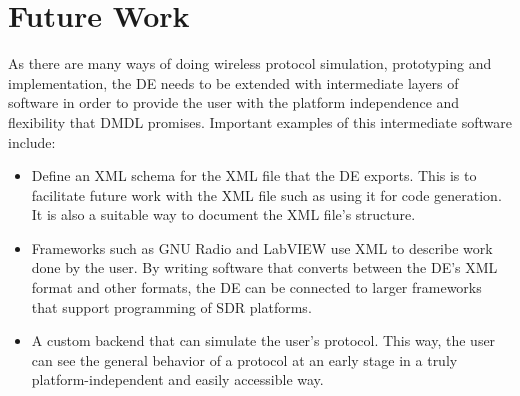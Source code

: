 \documentclass[journal,comsoc]{IEEEtran}
\begin{document}
\section{Future Work}
As there are many ways of doing wireless protocol simulation, prototyping and implementation, the
DE needs to be extended with intermediate layers of software in order to provide the user with
the platform independence and flexibility that DMDL promises. Important examples of this
intermediate software include:
\begin{itemize}
    \item Define an XML schema for the XML file that the DE exports. This is to facilitate
          future work with the XML file such as using it for code generation. It is also a
          suitable way to document the XML file's structure.
    \item Frameworks such as GNU Radio and LabVIEW use XML to describe work done by the user.
          By writing software that converts between the DE's XML format and other formats, the
          DE can be connected to larger frameworks that support programming of SDR platforms.
    \item A custom backend that can simulate the user's protocol. This way, the user can
          see the general behavior of a protocol at an early stage in a truly
          platform-independent and easily accessible way.
\end{itemize}

%
%
\end{document}
